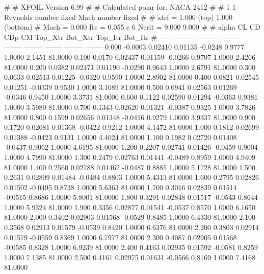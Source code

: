 #  
#       XFOIL         Version 6.99
#  
# Calculated polar for: NACA 2412                                       
#  
# 1 1 Reynolds number fixed          Mach number fixed         
#  
# xtrf =   1.000 (top)        1.000 (bottom)  
# Mach =   0.000     Re =     0.055 e 6     Ncrit =   9.000  9.000
#  
#   alpha    CL        CD       CDp       CM     Top_Xtr  Bot_Xtr  Top_Itr  Bot_Itr
#  ------ -------- --------- --------- -------- -------- -------- -------- --------
   0.000  -0.0003   0.02410   0.01135  -0.0248   0.9777   1.0000   2.1451  81.0000
   0.100   0.0170   0.02437   0.01159  -0.0266   0.9707   1.0000   2.4266  81.0000
   0.200   0.0382   0.02471   0.01190  -0.0290   0.9643   1.0000   2.6791  81.0000
   0.300   0.0633   0.02513   0.01225  -0.0320   0.9590   1.0000   2.8902  81.0000
   0.400   0.0821   0.02545   0.01251  -0.0339   0.9530   1.0000   3.1089  81.0000
   0.500   0.0941   0.02563   0.01269  -0.0346   0.9450   1.0000   3.3731  81.0000
   0.600   0.1122   0.02590   0.01294  -0.0363   0.9381   1.0000   3.5980  81.0000
   0.700   0.1343   0.02620   0.01321  -0.0387   0.9325   1.0000   3.7826  81.0000
   0.800   0.1599   0.02656   0.01348  -0.0416   0.9279   1.0000   3.9337  81.0000
   0.900   0.1720   0.02681   0.01368  -0.0422   0.9212   1.0000   4.1472  81.0000
   1.000   0.1812   0.02699   0.01388  -0.0423   0.9131   1.0000   4.4024  81.0000
   1.100   0.1982   0.02720   0.01408  -0.0437   0.9062   1.0000   4.6195  81.0000
   1.200   0.2207   0.02741   0.01426  -0.0459   0.9004   1.0000   4.7990  81.0000
   1.300   0.2479   0.02763   0.01441  -0.0489   0.8959   1.0000   4.9409  81.0000
   1.400   0.2560   0.02788   0.01462  -0.0487   0.8885   1.0000   5.1728  81.0000
   1.500   0.2631   0.02809   0.01484  -0.0484   0.8803   1.0000   5.4313  81.0000
   1.600   0.2795   0.02826   0.01502  -0.0495   0.8738   1.0000   5.6363  81.0000
   1.700   0.3016   0.02839   0.01514  -0.0515   0.8686   1.0000   5.8001  81.0000
   1.800   0.3291   0.02848   0.01517  -0.0543   0.8644   1.0000   5.9324  81.0000
   1.900   0.3356   0.02877   0.01541  -0.0537   0.8570   1.0000   6.1650  81.0000
   2.000   0.3402   0.02903   0.01568  -0.0529   0.8485   1.0000   6.4330  81.0000
   2.100   0.3568   0.02913   0.01579  -0.0539   0.8420   1.0000   6.6376  81.0000
   2.200   0.3803   0.02914   0.01579  -0.0559   0.8369   1.0000   6.7972  81.0000
   2.300   0.4087   0.02905   0.01568  -0.0585   0.8328   1.0000   6.9239  81.0000
   2.400   0.4163   0.02935   0.01592  -0.0581   0.8259   1.0000   7.1385  81.0000
   2.500   0.4161   0.02975   0.01631  -0.0566   0.8169   1.0000   7.4168  81.0000
